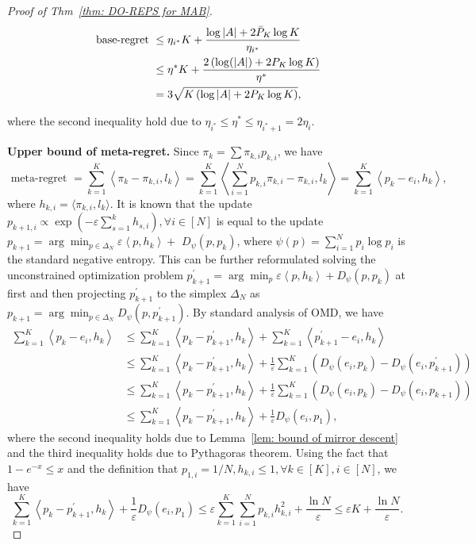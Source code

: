 \documentclass[11pt]{article}
\begin{document}
\begin{proof}[Proof of Thm~\ref{thm: DO-REPS for MAB}]
        \begin{align}
            \text { base-regret } & \leq \eta_{i^*} K+\frac{\log | A|+2 \bar{P}_K \log K}{\eta_{i^*}} \notag \\
            & \leq \eta^* K+\frac{2\left(\log (|A|)+2 P_K \log K\right)}{\eta^*}\notag \\
            &=3 \sqrt{K\left(\log |A|+2 P_K \log K\right)}, \label{eq: base-regret}
        \end{align}
    
    where the second inequality hold due to $\eta_{i^*} \leq \eta^* \leq \eta_{i^*+1}=2 \eta_i$. 
    
    
    \noindent \textbf{Upper bound of meta-regret.} Since $\pi_k = \sum \pi_{k,i}p_{k,i}$, we have 
    \[
        \text { meta-regret }=\sum_{k=1}^K\left\langle \pi_k-\pi_{k, i}, l_k\right\rangle=\sum_{k=1}^K\left\langle\sum_{i=1}^N p_{k, i} \pi_{k, i}-\pi_{k, i}, l_k\right\rangle=\sum_{k=1}^K\left\langle p_k-e_i, h_k\right\rangle,
    \]
    where $h_{k,i} = \langle \pi_{k,i}, l_k \rangle$. It is known that the update $p_{k+1, i} \propto \exp \left(-\varepsilon \sum_{s=1}^k h_{s, i}\right), \forall i \in[N]$ is equal to the update $p_{k+1}=\arg \min _{p \in \Delta_N} \varepsilon\left\langle p, h_k\right\rangle+$ $D_\psi\left(p, p_k\right)$, where $\psi(p)=\sum_{i=1}^N p_i \log p_i$ is the standard negative entropy. This can be further reformulated solving the 
    unconstrained optimization problem $p_{k+1}^{\prime}=\arg \min _p \varepsilon\left\langle p, h_k\right\rangle+D_\psi\left(p, p_k\right)$ at first and then projecting $p_{k+1}^{\prime}$ to the simplex $\Delta_N$ as $p_{k+1}=\arg \min _{p \in \Delta_N} D_\psi\left(p, p_{k+1}^{\prime}\right)$. By standard analysis of OMD, we have
    $$
    \begin{aligned}
    \sum_{k=1}^K\left\langle p_k-e_i, h_k\right\rangle & \leq \sum_{k=1}^K\left\langle p_k-p_{k+1}^{\prime}, h_k\right\rangle+\sum_{k=1}^K\left\langle p_{k+1}^{\prime}-e_i, h_k\right\rangle \\
    & \leq \sum_{k=1}^K\left\langle p_k-p_{k+1}^{\prime}, h_k\right\rangle+\frac{1}{\varepsilon} \sum_{k=1}^K\left(D_\psi\left(e_i, p_k\right)-D_\psi\left(e_i, p_{k+1}^{\prime}\right)\right) \\
    & \leq \sum_{k=1}^K\left\langle p_k-p_{k+1}^{\prime}, h_k\right\rangle+\frac{1}{\varepsilon} \sum_{k=1}^K\left(D_\psi\left(e_i, p_k\right)-D_\psi\left(e_i, p_{k+1}\right)\right) \\
    & \leq \sum_{k=1}^K\left\langle p_k-p_{k+1}^{\prime}, h_k\right\rangle+\frac{1}{\varepsilon} D_\psi\left(e_i, p_1\right),
    \end{aligned}
    $$
    where the second inequality holds due to Lemma~\ref{lem: bound of mirror descent} and the third inequality holds due to Pythagoras theorem. Using the fact that $1-e^{-x} \leq x$ and the definition that $p_{1, i}=1 / N, h_{k, i} \leq 1, \forall k \in[K], i \in[N]$, we have
    $$
    \sum_{k=1}^K\left\langle p_k-p_{k+1}^{\prime}, h_k\right\rangle+\frac{1}{\varepsilon} D_\psi\left(e_i, p_1\right) \leq \varepsilon \sum_{k=1}^K \sum_{i=1}^N p_{k, i} h_{k, i}^2+\frac{\ln N}{\varepsilon} \leq \varepsilon K+\frac{\ln N}{\varepsilon} .
    $$ 
    

\end{proof}
\end{document}
